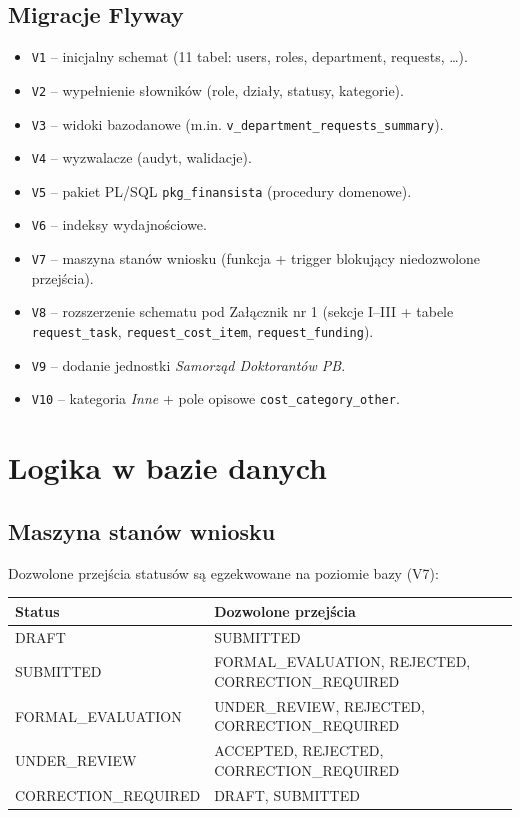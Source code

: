 \documentclass[12pt,a4paper]{article}
\begin{document}
\subsection{Migracje Flyway}
\begin{itemize}[leftmargin=*]
  \item \texttt{V1} -- inicjalny schemat (11 tabel: users, roles, department, requests, \ldots).
  \item \texttt{V2} -- wypełnienie słowników (role, działy, statusy, kategorie).
  \item \texttt{V3} -- widoki bazodanowe (m.in. \texttt{v\_department\_requests\_summary}).
  \item \texttt{V4} -- wyzwalacze (audyt, walidacje).
  \item \texttt{V5} -- pakiet PL/SQL \texttt{pkg\_finansista} (procedury domenowe).
  \item \texttt{V6} -- indeksy wydajnościowe.
  \item \texttt{V7} -- maszyna stanów wniosku (funkcja + trigger blokujący niedozwolone przejścia).
  \item \texttt{V8} -- rozszerzenie schematu pod Załącznik nr 1 (sekcje I--III + tabele
        \texttt{request\_task}, \texttt{request\_cost\_item}, \texttt{request\_funding}).
  \item \texttt{V9} -- dodanie jednostki \emph{Samorząd Doktorantów PB}.
  \item \texttt{V10} -- kategoria \emph{Inne} + pole opisowe \texttt{cost\_category\_other}.
\end{itemize}

\section{Logika w bazie danych}
\label{sec:plsql}

\subsection{Maszyna stanów wniosku}
Dozwolone przejścia statusów są egzekwowane na poziomie bazy (V7):

\begin{center}
\begin{tabular}{ll}
  \toprule
  \textbf{Status} & \textbf{Dozwolone przejścia} \\
  \midrule
  DRAFT & SUBMITTED \\
  SUBMITTED & FORMAL\_EVALUATION, REJECTED, CORRECTION\_REQUIRED \\
  FORMAL\_EVALUATION & UNDER\_REVIEW, REJECTED, CORRECTION\_REQUIRED \\
  UNDER\_REVIEW & ACCEPTED, REJECTED, CORRECTION\_REQUIRED \\
  CORRECTION\_REQUIRED & DRAFT, SUBMITTED \\
  \bottomrule
\end{tabular}
\end{center}
\end{document}
